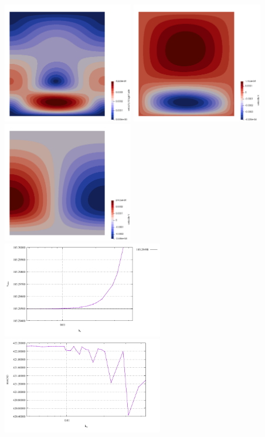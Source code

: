 \begin{center}
\includegraphics[width=5.7cm]{python_codes/fieldstone_25/results/100_100/vel}
\includegraphics[width=5.7cm]{python_codes/fieldstone_25/results/100_100/u}
\includegraphics[width=5.7cm]{python_codes/fieldstone_25/results/100_100/v}\\
\includegraphics[width=7cm]{python_codes/fieldstone_25/results/vrms_100.pdf}
\includegraphics[width=7cm]{python_codes/fieldstone_25/results/max_vel_100.pdf}\\

\end{center}
